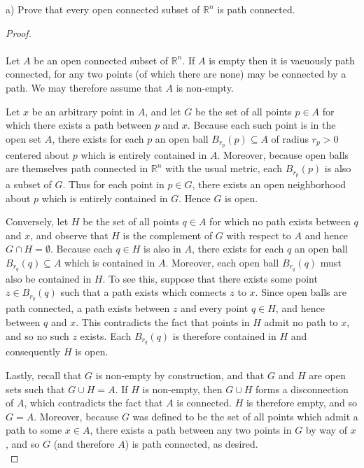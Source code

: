 a) Prove that every open connected subset of $\mathbb{R}^n$ is path connected.

\begin{proof}\ \\\\
    Let $A$ be an open connected subset of $\mathbb{R}^n$. If $A$ is empty then it is vacuously path connected, for any
    two points (of which there are none) may be connected by a path. We may therefore assume that $A$ is non-empty.

    Let $x$ be an arbitrary point in $A$, and let $G$ be the set of all points $p \in A$ for which there exists a path 
    between $p$ and $x$. Because each such point is in the open set $A$, there exists for each $p$ an open ball 
    $B_{r_p}(p) \subseteq A$ of radius $r_p > 0$ centered about $p$ which is entirely contained in $A$. Moreover, 
    because open balls are themselves path connected in $\mathbb{R}^n$ with the usual metric, each $B_{r_p}(p)$ is also
    a subset of $G$. Thus for each point in $p \in G$, there exists an open neighborhood about $p$ which is entirely 
    contained in $G$. Hence $G$ is open.

    Conversely, let $H$ be the set of all points $q \in A$ for which no path exists between $q$ and $x$, and observe
    that $H$ is the complement of $G$ with respect to $A$ and hence $G \cap H = \emptyset$. Because each $q \in H$ is 
    also in $A$, there exists for each $q$ an open ball $B_{r_q}(q) \subseteq A$ which is contained in $A$. Moreover,
    each open ball $B_{r_q}(q)$ must also be contained in $H$. To see this, suppose that there exists some point 
    $z \in B_{r_q}(q)$ such that a path exists which connects $z$ to $x$. Since open balls are path connected, a path 
    exists between $z$ and every point $q \in H$, and hence between $q$ and $x$. This contradicts the fact that points 
    in $H$ admit no path to $x$, and so no such $z$ exists. Each $B_{r_q}(q)$ is therefore contained in $H$ and 
    consequently $H$ is open.

    Lastly, recall that $G$ is non-empty by construction, and that $G$ and $H$ are open sets such that $G \cup H = A$.
    If $H$ is non-empty, then $G \cup H$ forms a disconnection of $A$, which contradicts the fact that $A$ is connected.
    $H$ is therefore empty, and so $G = A$. Moreover, because $G$ was defined to be the set of all points which admit a
    path to some $x \in A$, there exists a path between any two points in $G$ by way of $x$, and so $G$ (and therefore
    $A$) is path connected, as desired.
    \ \\
\end{proof}

